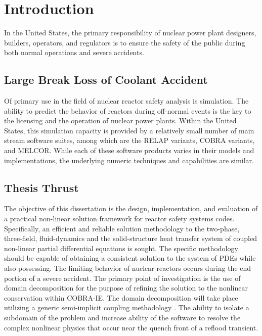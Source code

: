 \chapter{Introduction}
In the United States, the primary responsibility of nuclear power plant designers, builders, operators, and regulators is to ensure the safety of the public during both normal operations and severe accidents.

\section{Large Break Loss of Coolant Accident}
Of primary use in the field of nuclear reactor safety analysis is simulation.
The ability to predict the behavior of reactors during off-normal events is the key to the licensing and the operation of nuclear power plants.
Within the United States, this simulation capacity is provided by a relatively small number of main stream software suites, among which are the RELAP variants, COBRA variants, and MELCOR.
While each of these software products varies in their models and implementations, the underlying numeric techniques and capabilities are similar.

\section{Thesis Thrust}
The objective of this dissertation is the design, implementation, and evaluation of a practical non-linear solution framework for reactor safety systems codes.
Specifically, an efficient and reliable solution methodology to the two-phase, three-field, fluid-dynamics and the solid-structure heat transfer system of coupled non-linear partial differential equations is sought.
The specific methodology should be capable of obtaining a consistent solution to the system of PDEs while also possessing. \cite{Aktas1996}
The limiting behavior of nuclear reactors occurs during the end portion of a severe accident.
The primary point of investigation is the use of domain decomposition for the purpose of refining the solution to the nonlinear conservation within COBRA-IE.
The domain decomposition will take place utilizing a generic semi-implicit coupling methodology \cite{Weaver2002}.
The ability to isolate a subdomain of the problem and increase ability of the software to resolve the complex nonlinear physics that occur near the quench front of a reflood transient.

